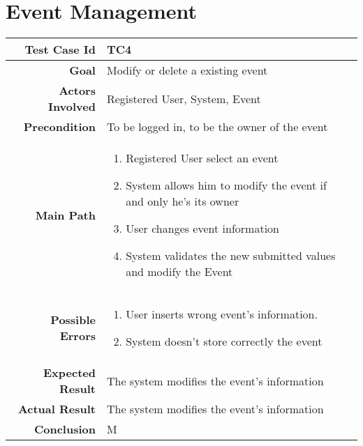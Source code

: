 \section{Event Management}
\begin{tabularx}{\linewidth}{|r|X|X|}

  \hline   {\bf Test Case Id} &  TC4\\
  \hline  {\bf Goal} & Modify or delete a existing event\\
  \hline  {\bf Actors Involved} & Registered User, System, Event\\
  \hline  {\bf Precondition} & To be logged in, to be the owner of the event\\ 
   \hline  {\bf Main Path} & \begin{enumerate} 
   \item Registered User select an event
   \item System allows him to modify the event if and only he's its owner
   \item User changes event information
    \item System validates the new submitted values and modify the Event
   \end{enumerate}\\
   \hline  {\bf Possible Errors} & \begin{enumerate} 
   \item User inserts wrong event's information.
   \item System doesn't store correctly the event
   \end{enumerate}\\
  \hline  {\bf Expected Result} & The system modifies the event's information\\
  \hline  {\bf Actual Result} & The system modifies the event's information\\
  \hline  {\bf Conclusion} & M\\
  \hline
  
\end{tabularx}

